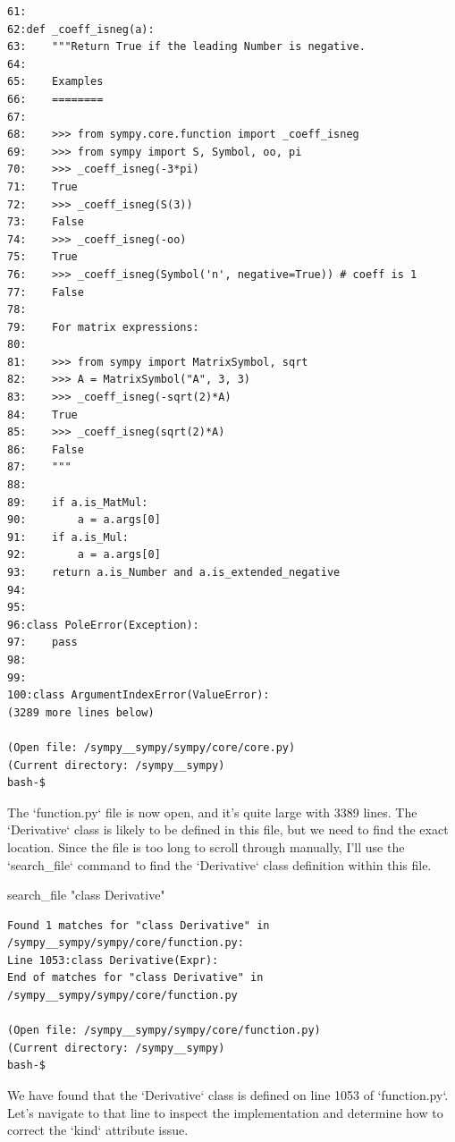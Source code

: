 {\begin{observationbox}
\begin{Verbatim}[breaklines=true, breakanywhere=true]
61:
62:def _coeff_isneg(a):
63:    """Return True if the leading Number is negative.
64:
65:    Examples
66:    ========
67:
68:    >>> from sympy.core.function import _coeff_isneg
69:    >>> from sympy import S, Symbol, oo, pi
70:    >>> _coeff_isneg(-3*pi)
71:    True
72:    >>> _coeff_isneg(S(3))
73:    False
74:    >>> _coeff_isneg(-oo)
75:    True
76:    >>> _coeff_isneg(Symbol('n', negative=True)) # coeff is 1
77:    False
78:
79:    For matrix expressions:
80:
81:    >>> from sympy import MatrixSymbol, sqrt
82:    >>> A = MatrixSymbol("A", 3, 3)
83:    >>> _coeff_isneg(-sqrt(2)*A)
84:    True
85:    >>> _coeff_isneg(sqrt(2)*A)
86:    False
87:    """
88:
89:    if a.is_MatMul:
90:        a = a.args[0]
91:    if a.is_Mul:
92:        a = a.args[0]
93:    return a.is_Number and a.is_extended_negative
94:
95:
96:class PoleError(Exception):
97:    pass
98:
99:
100:class ArgumentIndexError(ValueError):
(3289 more lines below)

(Open file: /sympy__sympy/sympy/core/core.py)
(Current directory: /sympy__sympy)
bash-$
\end{Verbatim}
\end{observationbox}
\begin{agentbox}
The `function.py` file is now open, and it's quite large with 3389 lines. The `Derivative` class is likely to be defined in this file, but we need to find the exact location. Since the file is too long to scroll through manually, I'll use the `search\_file` command to find the `Derivative` class definition within this file.



\hrulefill
\begin{CodeVerbatim}[breaklines=true, breakanywhere=true]
search_file "class Derivative"
\end{CodeVerbatim}
\end{agentbox}
\begin{observationbox}\begin{Verbatim}[breaklines=true, breakanywhere=true]
Found 1 matches for "class Derivative" in /sympy__sympy/sympy/core/function.py:
Line 1053:class Derivative(Expr):
End of matches for "class Derivative" in /sympy__sympy/sympy/core/function.py

(Open file: /sympy__sympy/sympy/core/function.py)
(Current directory: /sympy__sympy)
bash-$
\end{Verbatim}
\end{observationbox}
\begin{agentbox}
We have found that the `Derivative` class is defined on line 1053 of `function.py`. Let's navigate to that line to inspect the implementation and determine how to correct the `kind` attribute issue.




\end{agentbox}}
